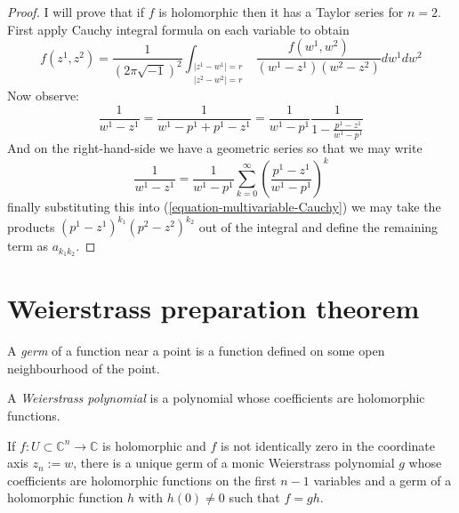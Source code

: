 \begin{proof}
I will prove that if $f$ is holomorphic then it has a Taylor series for $n=2$. 
First apply Cauchy integral formula on each variable to obtain
$$
f(z^1,z^2)=\frac{1}{(2\pi\sqrt{-1})^2}
\int_{\substack{|z^1-w^1|=r \\ |z^2-w^2|=r}}
\frac{f(w^1,w^2)}{(w^1-z^1)(w^2-z^2)}dw^1dw^2
$$
Now observe:
\begin{equation}
\label{equation-multivariable-Cauchy}
\frac{1}{w^1-z^1}=\frac{1}{w^1-p^1+p^1-z^1}
=\frac{1}{w^1-p^1}\frac{1}{1-\frac{p^1-z^1}{w^1-p^1}}
\end{equation}
And on the right-hand-side we have a geometric series so that we may write
$$
\frac{1}{w^1-z^1}
=\frac{1}{w^1-p^1}\sum_{k=0}^\infty\left(\frac{p^1-z^1}{w^1-p^1}\right)^k
$$
finally substituting this into (\ref{equation-multivariable-Cauchy}) we may take
the products $(p^1-z^1)^{k_1}(p^2-z^2)^{k_2}$ out of the integral and define the
remaining term as $a_{k_1k_2}$.
\end{proof}

\section{Weierstrass preparation theorem}
\label{section-Weierstrass-preparation-theorem}

\begin{definition}
\label{definition-germ}
A {\it germ} of a function near a point is a function defined on some open 
neighbourhood of the point.
\end{definition}

\begin{definition}
\label{definition-Weierstrass-polynomial}
A {\it Weierstrass polynomial} is a polynomial whose coefficients are
holomorphic functions.
\end{definition}

\begin{theorem}
\label{theorem-Weierstrass-preparation}
If $f:U\subset\mathbb{C}^n\to\mathbb{C}$ is holomorphic and $f$ is not
identically zero in the coordinate axis $z_n:=w$, there
is a unique germ of a monic Weierstrass polynomial $g$ whose coefficients are
holomorphic functions on the first $n-1$ variables 
and a germ of a holomorphic 
function $h$ with $h(0)\neq 0$ such that $f=gh$.
\end{theorem}

